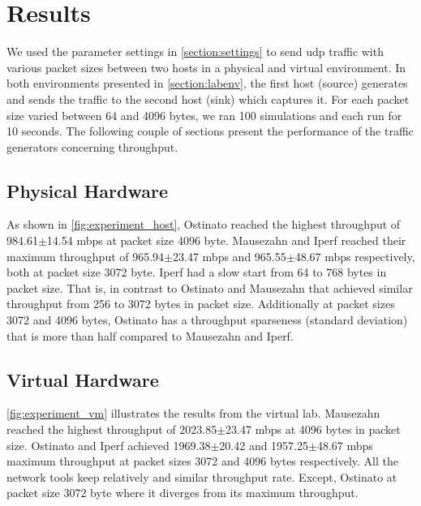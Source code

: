 \chapter{Results}\label{results}

We used the parameter settings in \cref{section:settings} to send \acrshort{udp} traffic with various packet sizes between two hosts in a physical and virtual environment.
In both environments presented in \cref{section:labenv}, the first host (source) generates and sends the traffic to the second host (sink) which captures it.
For each packet size varied between 64 and 4096 bytes, we ran 100 simulations and each run for 10 seconds.
The following couple of sections present the performance of the traffic generators concerning throughput.


\section{Physical Hardware}


\skippara As shown in \cref{fig:experiment_host}, Ostinato reached the highest throughput of 984.61$\pm$14.54 \acrshort{mbps} at packet size 4096 byte.
Mausezahn and Iperf reached their maximum throughput of 965.94$\pm$23.47 \acrshort{mbps} and 965.55$\pm$48.67 \acrshort{mbps} respectively, both at packet size 3072 byte.
Iperf had a slow start from 64 to 768 bytes in packet size.
That is, in contrast to Ostinato and Mausezahn that achieved similar throughput from 256 to 3072 bytes in packet size.
Additionally at packet sizes 3072 and 4096 bytes, Ostinato has a throughput sparseness (standard deviation) that is more than half compared to Mausezahn and Iperf.

\section{Virtual Hardware}


\skippara \cref{fig:experiment_vm} illustrates the results from the virtual lab.
Mausezahn reached the highest throughput of 2023.85$\pm$23.47 \acrshort{mbps} at 4096 bytes in packet size.
Ostinato and Iperf achieved 1969.38$\pm$20.42 and 1957.25$\pm$48.67 \acrshort{mbps} maximum throughput at packet sizes 3072 and 4096 bytes respectively.
All the network tools keep relatively and similar throughput rate.
Except, Ostinato at packet size 3072 byte where it diverges from its maximum throughput.
